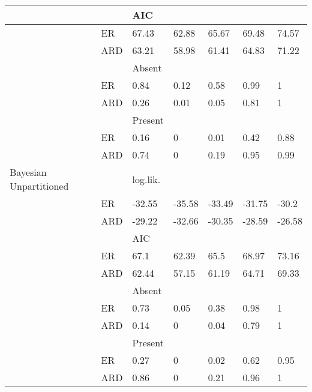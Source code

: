 \begin{tabular}{l|l|l|l|l|l|l}
\hline
 &  & AIC &  &  &  & \\
\hline
 & ER & 67.43 & 62.88 & 65.67 & 69.48 & 74.57\\
\hline
 & ARD & 63.21 & 58.98 & 61.41 & 64.83 & 71.22\\
\hline
 &  & Absent &  &  &  & \\
\hline
 & ER & 0.84 & 0.12 & 0.58 & 0.99 & 1\\
\hline
 & ARD & 0.26 & 0.01 & 0.05 & 0.81 & 1\\
\hline
 &  & Present &  &  &  & \\
\hline
 & ER & 0.16 & 0 & 0.01 & 0.42 & 0.88\\
\hline
 & ARD & 0.74 & 0 & 0.19 & 0.95 & 0.99\\
\hline
Bayesian Unpartitioned &  & log.lik. &  &  &  & \\
\hline
 & ER & -32.55 & -35.58 & -33.49 & -31.75 & -30.2\\
\hline
 & ARD & -29.22 & -32.66 & -30.35 & -28.59 & -26.58\\
\hline
 &  & AIC &  &  &  & \\
\hline
 & ER & 67.1 & 62.39 & 65.5 & 68.97 & 73.16\\
\hline
 & ARD & 62.44 & 57.15 & 61.19 & 64.71 & 69.33\\
\hline
 &  & Absent &  &  &  & \\
\hline
 & ER & 0.73 & 0.05 & 0.38 & 0.98 & 1\\
\hline
 & ARD & 0.14 & 0 & 0.04 & 0.79 & 1\\
\hline
 &  & Present &  &  &  & \\
\hline
 & ER & 0.27 & 0 & 0.02 & 0.62 & 0.95\\
\hline
 & ARD & 0.86 & 0 & 0.21 & 0.96 & 1\\
\hline
\end{tabular}
